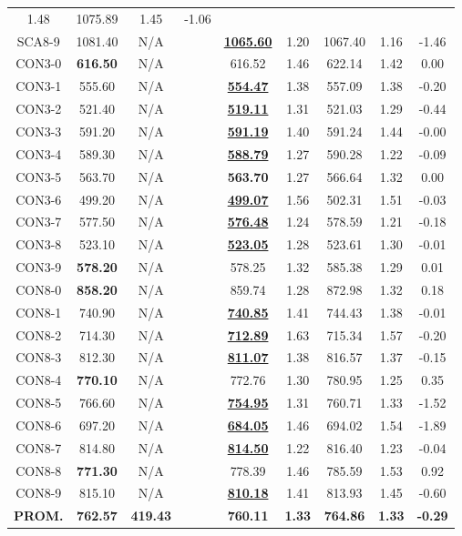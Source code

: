 \begin{table}[h]
\begin{tabular*}{1.00\textwidth}{@{\extracolsep{\fill}} |c||c c||c c c c c c|}
1.48 & 1075.89 & 1.45 & -1.06\\SCA8-9 & 1081.40 & N/A & & \bf{\underline{1065.60}} & 
1.20 & 1067.40 & 1.16 & -1.46\\CON3-0 & \bf{616.50} & N/A & & 
616.52 & 1.46 & 622.14 & 1.42 & 0.00\\CON3-1 & 555.60 & N/A & & \bf{\underline{554.47}} & 
1.38 & 557.09 & 1.38 & -0.20\\CON3-2 & 521.40 & N/A & & \bf{\underline{519.11}} & 
1.31 & 521.03 & 1.29 & -0.44\\CON3-3 & 591.20 & N/A & & \bf{\underline{591.19}} & 
1.40 & 591.24 & 1.44 & -0.00\\CON3-4 & 589.30 & N/A & & \bf{\underline{588.79}} & 
1.27 & 590.28 & 1.22 & -0.09\\CON3-5 & 563.70 & N/A & & \bf{563.70} & 
1.27 & 566.64 & 1.32 & 0.00\\CON3-6 & 499.20 & N/A & & \bf{\underline{499.07}} & 
1.56 & 502.31 & 1.51 & -0.03\\CON3-7 & 577.50 & N/A & & \bf{\underline{576.48}} & 
1.24 & 578.59 & 1.21 & -0.18\\CON3-8 & 523.10 & N/A & & \bf{\underline{523.05}} & 
1.28 & 523.61 & 1.30 & -0.01\\CON3-9 & \bf{578.20} & N/A & & 
578.25 & 1.32 & 585.38 & 1.29 & 0.01\\CON8-0 & \bf{858.20} & N/A & & 
859.74 & 1.28 & 872.98 & 1.32 & 0.18\\CON8-1 & 740.90 & N/A & & \bf{\underline{740.85}} & 
1.41 & 744.43 & 1.38 & -0.01\\CON8-2 & 714.30 & N/A & & \bf{\underline{712.89}} & 
1.63 & 715.34 & 1.57 & -0.20\\CON8-3 & 812.30 & N/A & & \bf{\underline{811.07}} & 
1.38 & 816.57 & 1.37 & -0.15\\CON8-4 & \bf{770.10} & N/A & & 
772.76 & 1.30 & 780.95 & 1.25 & 0.35\\CON8-5 & 766.60 & N/A & & \bf{\underline{754.95}} & 
1.31 & 760.71 & 1.33 & -1.52\\CON8-6 & 697.20 & N/A & & \bf{\underline{684.05}} & 
1.46 & 694.02 & 1.54 & -1.89\\CON8-7 & 814.80 & N/A & & \bf{\underline{814.50}} & 
1.22 & 816.40 & 1.23 & -0.04\\CON8-8 & \bf{771.30} & N/A & & 
778.39 & 1.46 & 785.59 & 1.53 & 0.92\\CON8-9 & 815.10 & N/A & & \bf{\underline{810.18}} & 
1.41 & 813.93 & 1.45 & -0.60\\\hline\hline\bf{PROM.} & 
\bf{762.57} & \bf{419.43} & & \bf{760.11} & \bf{1.33} & \bf{764.86} & \bf{1.33} & \bf{-0.29}\\[1ex]\hline
\end{tabular*}
\label{apendice-table:aco-finalD}
\end{table}


